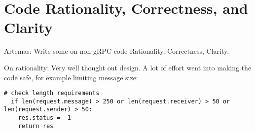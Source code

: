 \documentclass[9pt,twocolumn,twoside]{osajnl}
\begin{document}








\section{Code Rationality, Correctness, and Clarity}
\label{sec:examples}
Artemas: Write some on non-gRPC code Rationality, Correctness, Clarity.

\bigskip

\noindent 

On rationality: Very well thought out design. A lot of effort went into making the code safe, for example limiting message size: 

\begin{lstlisting}[caption={Account Creation Test}]
  # check length requirements
  if len(request.message) > 250 or len(request.receiver) > 50 or len(request.sender) > 50:
    res.status = -1
    return res
\end{lstlisting}
\end{document}
